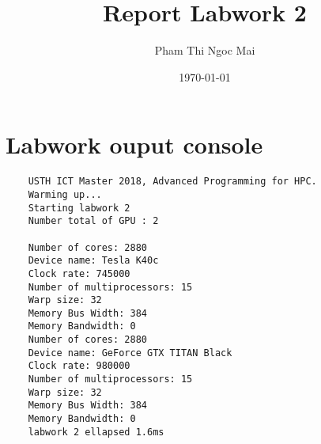 \documentclass{article}
\title{Report Labwork 2}
\author{Pham Thi Ngoc Mai}
\date{\today}
\begin{document}
\maketitle

\section{Labwork ouput console}
\begin{verbatim}
    USTH ICT Master 2018, Advanced Programming for HPC.
    Warming up...
    Starting labwork 2
    Number total of GPU : 2

    Number of cores: 2880
    Device name: Tesla K40c
    Clock rate: 745000
    Number of multiprocessors: 15
    Warp size: 32
    Memory Bus Width: 384
    Memory Bandwidth: 0
    Number of cores: 2880
    Device name: GeForce GTX TITAN Black
    Clock rate: 980000
    Number of multiprocessors: 15   
    Warp size: 32
    Memory Bus Width: 384
    Memory Bandwidth: 0
    labwork 2 ellapsed 1.6ms
\end{verbatim}
\end{document}
